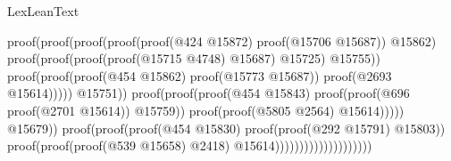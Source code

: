\begin{lexlean}{LexLeanText}
\begin{coremodule}
                                                                            proof(proof(proof(proof(proof(@424
                                                                                        @15872)
                                                                                      proof(@15706
                                                                                          @15687))
                                                                                    @15862)
                                                                                  proof(proof(proof(proof(@15715
                                                                                            @4748)
                                                                                          @15687)
                                                                                        @15725)
                                                                                      @15755))
                                                                                proof(proof(proof(@454
                                                                                        @15862)
                                                                                      proof(@15773
                                                                                          @15687))
                                                                                    proof(@2693
                                                                                        @15614)))))
                                                                      @15751))
                                                                proof(proof(proof(@454 @15843)
                                                                      proof(proof(@696
                                                                            proof(@2701 @15614))
                                                                          @15759))
                                                                    proof(proof(@5805 @2564)
                                                                        @15614)))))
                                                      @15679))
                                                proof(proof(proof(@454 @15830)
                                                      proof(proof(@292 @15791) @15803))
                                                    proof(proof(proof(@539 @15658) @2418)
                                                        @15614))))))))))))))))))))

\end{coremodule}
\end{lexlean}
